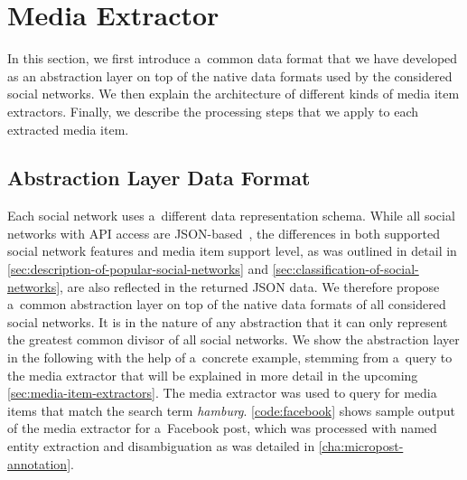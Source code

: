 \section{Media Extractor}
\label{sec:media-extractor}

In this section, we first introduce a~common data format
that we have developed as an abstraction layer on top of the native
data formats used by the considered social networks.
We then explain the architecture
of different kinds of media item extractors.
Finally, we describe the processing steps
that we apply to each extracted media item.

\subsection{Abstraction Layer Data Format}
\label{sec:data-format}

Each social network uses a~different data representation schema.
While all social networks with API access are
JSON-based~\cite{crockford2006json}, the differences in both
supported social network features and media item support level,
as was outlined in detail in
\autoref{sec:description-of-popular-social-networks} and
\autoref{sec:classification-of-social-networks},
are also reflected in the returned JSON data.
We therefore propose a~common abstraction layer
on top of the native data formats of all considered social networks.
It is in the nature of any abstraction
that it can only represent the
greatest common divisor of all social networks.
We show the abstraction layer in the following
with the help of a~concrete example,
stemming from a~query to the media extractor
that will be explained in more detail
in the upcoming \autoref{sec:media-item-extractors}.
The media extractor was used to query for media items
that match the search term \emph{hamburg}.
\autoref{code:facebook} shows sample output of the media extractor
for a~Facebook post, which was processed
with named entity extraction and disambiguation
as was detailed in \autoref{cha:micropost-annotation}.

